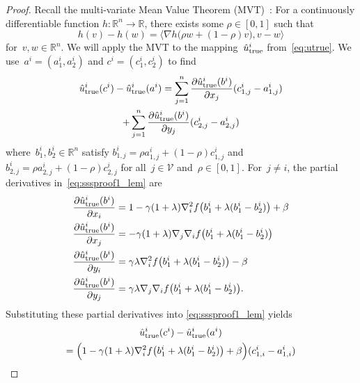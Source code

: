 \documentclass[9pt,shortpaper,twoside,web]{ieeecolor}
\newcommand{\V}{\ensuremath{\mathcal{V}}\xspace}
\newcommand{\tr}{\textnormal{true}}
\begin{document}
    \begin{proof}
        Recall the multi-variate Mean Value Theorem (MVT)~\cite[Theorem 1.9.1]{hubbard2002vector}:
    For a continuously differentiable function $h:\mathbb{R}^n\rightarrow\mathbb{R}$, there exists some $\rho\in[0,1]$ such that
    \begin{equation}
        h(v)-h(w)=\big\langle \nabla h\big(\rho w+(1-\rho)v\big),v-w\big\rangle
    \end{equation}
    for~$v, w \in \mathbb{R}^n$. 
    We will apply the MVT to the mapping~$\hat{u}^i_{\tr}$ from~\eqref{eq:utrue}.
    We use~$a^i=(a^i_1,a^i_2)$ and $c^i=(c^i_1,c^i_2)$ to find
    \begin{multline}\label{eq:sssproof1_lem}
        \hat u^i_\tr(c^i)-\hat u^i_\tr(a^i) = \sum_{j=1}^n \frac{\partial \hat u^i_\tr(b^i)}{\partial x_j}(c^i_{1,j}-a^i_{1,j})
        \\ + \sum_{j=1}^n \frac{\partial \hat u^i_\tr(b^i)}{\partial y_j}(c^i_{2,j}-a^i_{2,j})
    \end{multline}
    where~$b^i_1,b^i_2 \in \mathbb{R}^n$ satisfy
    $b^i_{1,j} =\rho a^i_{1,j}+(1-\rho)c^i_{1,j}$ and~$b^i_{2,j}=\rho a^i_{2,j}+(1-\rho)c^i_{2,j}$ for all~$j \in \V$
    and~$\rho \in [0, 1]$. 
    For~$j \neq i$, the partial derivatives in~\eqref{eq:sssproof1_lem} are
    \begin{align}
        \frac{\partial \hat u^i_\tr(b^i)}{\partial x_i}&= 1-\gamma(1+\lambda)\nabla^2_if\big(b^i_1+\lambda(b^i_1-b^i_2)\big)+\beta
        \\ \frac{\partial \hat u^i_\tr(b^i)}{\partial x_j} &= -\gamma(1+\lambda)\nabla_j\nabla_if\big(b^i_1+\lambda(b^i_1-b^i_2)\big)
        \\ \frac{\partial \hat u^i_\tr(b^i)}{\partial y_i} &= \gamma\lambda \nabla^2_i f \big(b^i_1 + \lambda (b^i_1-b^i_2)\big)- \beta
        \\ \frac{\partial \hat u^i_\tr(b^i)}{\partial y_j} &= \gamma\lambda \nabla_j\nabla_i f \big( b^i_1 + \lambda(b^i_1-b^i_2)\big). 
    \end{align}    
    Substituting these partial derivatives into \eqref{eq:sssproof1_lem} yields
    \begin{multline}
        \hat u^i_\tr(c^i)-\hat u^i_\tr(a^i)\\ = \Big(1 - \gamma(1+\lambda)\nabla_i^2f\big( b^i_1 + \lambda(b^i_1-b^i_2)\big)
        +\beta\Big)(c^i_{1,i}-a^i_{1,i}) 

\end{multline}
\end{proof}
\end{document}
